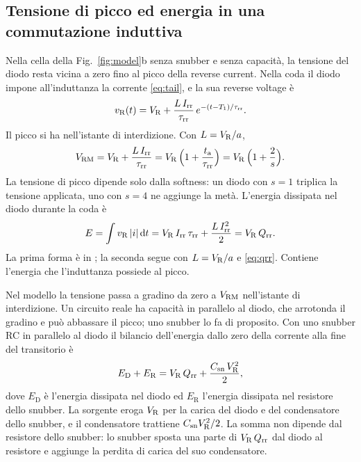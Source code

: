 \documentclass[10pt,a4paper]{scrartcl}
\let\newcommand\lmitdefine
\newcommand{\VR}{V_\mathrm{R}}
\newcommand{\Irr}{I_\mathrm{rr}}
\newcommand{\Qrr}{Q_\mathrm{rr}}
\newcommand{\ta}{t_\mathrm{a}}
\newcommand{\taurr}{\tau_\mathrm{rr}}
\newcommand{\Tone}{T_1}
\newcommand{\Csn}{C_\mathrm{sn}}
\newcommand{\Vrm}{V_\mathrm{RM}}
\newcommand{\diff}{\mathrm{d}}
\begin{document}
\subsection{Tensione di picco ed energia in una commutazione induttiva}
\label{sec:energy}
Nella cella della Fig.~\ref{fig:model}b senza snubber e senza capacità, la tensione del diodo resta vicina a zero fino al picco della reverse current. Nella coda il diodo impone all'induttanza la corrente \eqref{eq:tail}, e la sua reverse voltage è
\begin{equation}
v_\mathrm{R}(t) = \VR + \frac{L\,\Irr}{\taurr}\,e^{-(t-\Tone)/\taurr} .
\end{equation}
Il picco si ha nell'istante di interdizione. Con $L = \VR/a$,
\begin{equation}
\Vrm = \VR + \frac{L\,\Irr}{\taurr} = \VR\,\Bigl(1 + \frac{\ta}{\taurr}\Bigr) = \VR\,\Bigl(1 + \frac{2}{s}\Bigr) .
\label{eq:vrm}
\end{equation}
La tensione di picco dipende solo dalla softness: un diodo con $s = 1$ triplica la tensione applicata, uno con $s = 4$ ne aggiunge la metà. L'energia dissipata nel diodo durante la coda è
\begin{equation}
E = \int v_\mathrm{R}\,|i|\,\diff t = \VR\,\Irr\,\taurr + \frac{L\,\Irr^2}{2} = \VR\,\Qrr .
\label{eq:erec}
\end{equation}
La prima forma è in \cite{mathworks}; la seconda segue con $L = \VR/a$ e \eqref{eq:qrr}. Contiene l'energia che l'induttanza possiede al picco.

Nel modello la tensione passa a gradino da zero a $\Vrm$ nell'istante di interdizione. Un circuito reale ha capacità in parallelo al diodo, che arrotonda il gradino e può abbassare il picco; uno snubber lo fa di proposito. Con uno snubber RC in parallelo al diodo il bilancio dell'energia dallo zero della corrente alla fine del transitorio è
\begin{equation}
E_\mathrm{D} + E_\mathrm{R} = \VR\,\Qrr + \frac{\Csn\,\VR^2}{2} ,
\label{eq:ebal}
\end{equation}
dove $E_\mathrm{D}$ è l'energia dissipata nel diodo ed $E_\mathrm{R}$ l'energia dissipata nel resistore dello snubber. La sorgente eroga $\VR$ per la carica del diodo e del condensatore dello snubber, e il condensatore trattiene $\Csn\VR^2/2$. La somma non dipende dal resistore dello snubber: lo snubber sposta una parte di $\VR\,\Qrr$ dal diodo al resistore e aggiunge la perdita di carica del suo condensatore.
\end{document}
